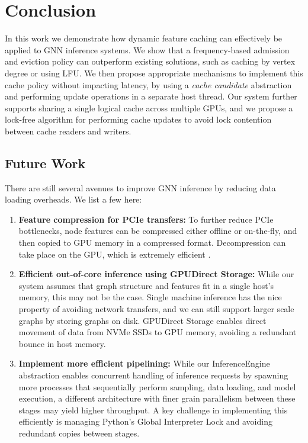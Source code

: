 \chapter{Conclusion}
In this work we demonstrate how dynamic feature caching can effectively be applied to GNN inference systems. We show that a frequency-based admission and eviction policy can outperform existing solutions, such as caching by vertex degree or using LFU. We then propose appropriate mechanisms to implement this cache policy without impacting latency, by using a \textit{cache candidate} abstraction and performing update operations in a separate host thread.
Our system further supports sharing a single logical cache across multiple GPUs, and we propose a lock-free algorithm for performing cache updates to avoid lock contention between cache readers and writers.

\section{Future Work}
There are still several avenues to improve GNN inference by reducing data loading overheads. We list a few here:
\begin{enumerate}
    \item \textbf{Feature compression for PCIe transfers:} To further reduce PCIe bottlenecks, node features can be compressed either offline or on-the-fly, and then copied to GPU memory in a compressed format. Decompression can take place on the GPU, which is extremely efficient \cite{NVComp}.
    \item \textbf{Efficient out-of-core inference using GPUDirect Storage:} While our system assumes that graph structure and features fit in a single host's memory, this may not be the case. Single machine inference has the nice property of avoiding network transfers, and we can still support larger scale graphs by storing graphs on disk. GPUDirect Storage \cite{GDS} enables direct movement of data from NVMe SSDs to GPU memory, avoiding a redundant bounce in host memory.
    \item \textbf{Implement more efficient pipelining:} While our InferenceEngine abstraction enables concurrent handling of inference requests by spawning more processes that sequentially perform sampling, data loading, and model execution, a different architecture with finer grain parallelism between these stages may yield higher throughput. A key challenge in implementing this efficiently is managing Python's Global Interpreter Lock and avoiding redundant copies between stages.
\end{enumerate}


